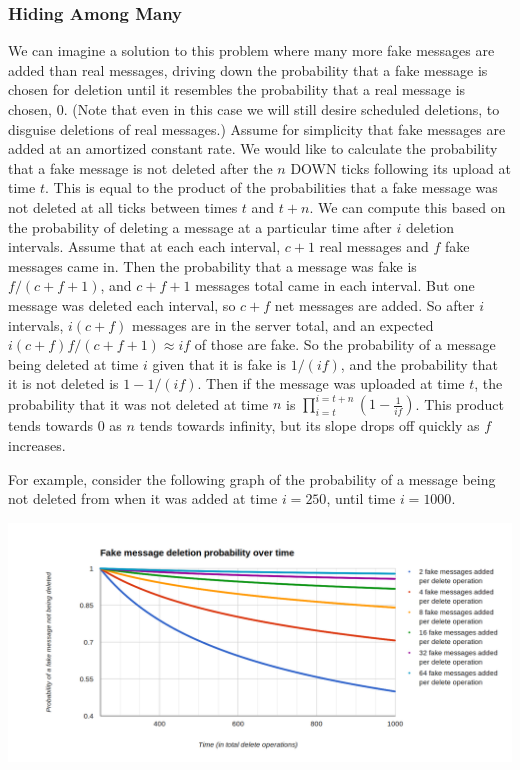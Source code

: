 \documentclass[pageno]{jpaper}
\begin{document}
\subsubsection{Hiding Among Many}
We can imagine a solution to this problem where many more fake messages are added than real messages, driving down the probability that a fake message is chosen for deletion until it resembles the probability that a real message is chosen, 0. (Note that even in this case we will still desire scheduled deletions, to disguise deletions of real messages.) Assume for simplicity that fake messages are added at an amortized constant rate. We would like to calculate the probability that a fake message is not deleted after the $n$ DOWN ticks following its upload at time $t$. This is equal to the product of the probabilities that a fake message was not deleted at all ticks between times $t$ and $t+n$. We can compute this based on the probability of deleting a message at a particular time after $i$ deletion intervals. Assume that at each each interval, $c+1$ real messages and $f$ fake messages came in. Then the probability that a message was fake is $f/(c+f+1)$, and $c+f+1$ messages total came in each interval. But one message was deleted each interval, so $c+f$ net messages are added. So after $i$ intervals, $i(c+f)$ messages are in the server total, and an expected $i(c+f)f/(c+f+1)\approx if$ of those are fake. So the probability of a message being deleted at time $i$ given that it is fake is $1/(if)$, and the probability that it is not deleted is $1-1/(if)$. Then if the message was uploaded at time $t$, the probability that it was not deleted at time $n$ is $\displaystyle\prod_{i=t}^{i=t+n}(1-\frac{1}{if})$. This product tends towards 0 as $n$ tends towards infinity, but its slope drops off quickly as $f$ increases.

For example, consider the following graph of the probability of a message being not deleted from when it was added at time $i=250$, until time $i=1000$.

\includegraphics[width=\textwidth]{many_lines_2}
\end{document}
